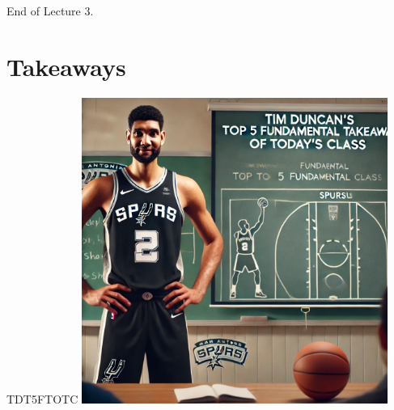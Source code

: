 \documentclass{beamer}
\begin{document}
\begin{frame}{}
    \centering
    \Huge End of Lecture 3.
\end{frame}

\section*{Takeaways}

\begin{frame}{TDT5FTOTC}
    \centering
    \includegraphics[width=0.75\textwidth]{figures/tim.png}
\end{frame}
\end{document}
